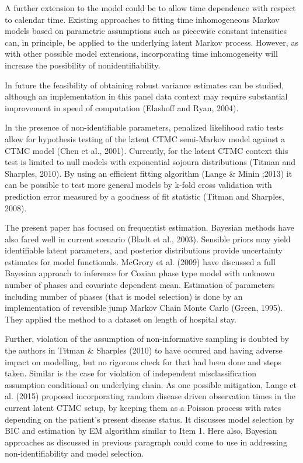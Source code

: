 \documentclass{uwstat572}
\begin{document}
A further extension to the model could be to allow time dependence with respect to calendar time. Existing approaches to fitting time inhomogeneous Markov models based on parametric assumptions such as piecewise constant intensities can, in principle, be applied to the underlying latent Markov process. However, as with other possible model extensions, incorporating time inhomogeneity will increase the possibility of nonidentifiability.

In future the feasibility of obtaining robust variance estimates can be studied, although an implementation in this panel data context may require substantial improvement in speed of computation (Elashoff and Ryan, 2004).

In the presence of non-identifiable parameters, penalized likelihood ratio tests allow for hypothesis testing of the latent CTMC semi-Markov model against a CTMC model (Chen et al., 2001). Currently, for the latent CTMC context this test is limited to null models with exponential sojourn distributions (Titman and Sharples, 2010). By using an efficient fitting algorithm (Lange \& Minin ;2013) it can be possible to test more general models by k-fold cross validation with prediction error measured by a goodness of fit statistic (Titman and Sharples, 2008).

The present paper has focused on frequentist estimation. Bayesian methods have also fared well in current scenario (Bladt et al., 2003). Sensible priors may yield identifiable latent parameters, and posterior distributions provide uncertainty estimates for model functionals. McGrory et al. (2009) have discussed a full Bayesian approach to inference for Coxian phase type model with unknown number of phases and covariate dependent mean. Estimation of parameters including number of phases (that is model selection) is done by an implementation of reversible jump Markov Chain Monte Carlo (Green, 1995). They applied the method to a dataset on length of hospital stay.

Further, violation of the assumption of non-informative sampling is doubted by the authors in Titman \& Sharples (2010) to have occured and having adverse impact on modelling, but no rigorous check for that had been done and steps taken. Similar is the case for violation of independent misclassification assumption conditional on underlying chain. As one possible mitigation, Lange et al. (2015) proposed incorporating random disease driven observation times in the current latent CTMC setup, by keeping them as a Poisson process with rates depending on the patient's present disease status. It discusses model selection by BIC and estimation by EM algorithm similar to Item 1. Here also, Bayesian approaches as discussed in previous paragraph could come to use in addressing non-identifiability and model selection.
\end{document}
